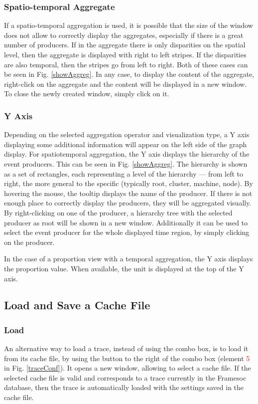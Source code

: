 \documentclass[twoside]{article}
\begin{document}
\begin{sloppypar}
\subsubsection{Spatio-temporal Aggregate}
If a spatio-temporal aggregation is used, it is possible that the size of the window does not allow to correctly display the aggregates, especially if there is a great number of producers. If in the aggregate there is only disparities on the spatial level, then the aggregate is displayed with right to left stripes. If the disparities are also temporal, then the stripes go from left to right. Both of these cases can be seen in Fig. \ref{showAggreg}. In any case, to display the content of the aggregate, right-click on the aggregate and the content will be displayed in a new window. To close the newly created window, simply click on it.

\subsubsection{Y Axis}
Depending on the selected aggregation operator and visualization type, a Y axis displaying some additional information will appear on the left side of the graph display. For spatiotemporal aggregation, the Y axis displays the hierarchy of the event producers. This can be seen in Fig. \ref{showAggreg}. The hierarchy is shown as a set of rectangles, each representing a level of the hierarchy --- from left to right, the more general to the specific (typically root, cluster, machine, node). By hovering the mouse, the tooltip displays the name of the producer. If there is not enough place to correctly display the producers, they will be aggregated visually. By right-clicking on one of the producer, a hierarchy tree with the selected producer as root will be shown in a new window. Additionally it can be used to select the event producer for the whole displayed time region, by simply clicking on the producer.

In the case of a proportion view with a temporal aggregation, the Y axis displays the proportion value. When available, the unit is displayed at the top of the Y axis.

\subsection{Load and Save a Cache File}
\subsubsection{Load}
An alternative way to load a trace, instead of using the combo box, is to load it from its cache file, by using the button to the right of the combo box (element \textcolor{red}{5} in Fig. \ref{traceConf}). It opens a new window, allowing to select a cache file. If the selected cache file is valid and corresponds to a trace currently in the Framesoc database, then the trace is automatically loaded with the settings saved in the cache file.


\end{sloppypar}
\end{document}
